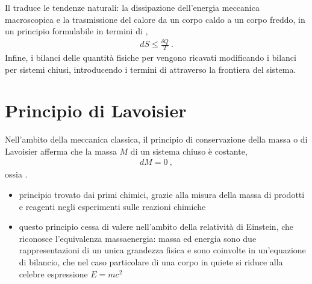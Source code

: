\documentclass[letterpaper,10pt,italian]{jupyterBook}
\begin{document}
\sphinxAtStartPar
Il {\hyperref[\detokenize{ch/thermodynamics/principles-second:physics-hs-thermodynamics-foundation-principles-second}]{}} traduce le tendenze naturali: la dissipazione dell’energia meccanica macroscopica e la trasmissione del calore da un corpo caldo a un corpo freddo, in un principio formulabile in termini di ,
\begin{equation*}
\begin{split}d S \le \frac{\delta Q}{T} \ .\end{split}
\end{equation*}
\sphinxAtStartPar
Infine, i bilanci delle quantità fisiche per {\hyperref[\detokenize{ch/thermodynamics/principles-open:physics-hs-thermodynamics-foundation-principles-open}]{}} vengono ricavati modificando i bilanci per sistemi chiusi, introducendo i termini di  attraverso la frontiera del sistema.



\sphinxstepscope


\section{Principio di Lavoisier}
\label{\detokenize{ch/thermodynamics/principles-lavoisier:principio-di-lavoisier}}\label{\detokenize{ch/thermodynamics/principles-lavoisier:physics-hs-thermodynamics-foundation-principles-lavoisier}}\label{\detokenize{ch/thermodynamics/principles-lavoisier::doc}}
\sphinxAtStartPar
Nell’ambito della meccanica classica, il principio di conservazione della massa \sphinxhyphen{} o di Lavoisier \sphinxhyphen{} afferma che la massa \(M\) di un sistema chiuso è costante,
\begin{equation*}
\begin{split}d M = 0 \ ,\end{split}
\end{equation*}
\sphinxAtStartPar
ossia .
\begin{itemize}
\item {} 
\sphinxAtStartPar
principio trovato dai primi chimici, grazie alla misura della massa di prodotti e reagenti negli esperimenti sulle reazioni chimiche

\item {} 
\sphinxAtStartPar
questo principio cessa di valere nell’ambito della relatività di Einstein, che riconosce l’equivalenza massa\sphinxhyphen{}energia: massa ed energia sono due rappresentazioni di un unica grandezza fisica e sono coinvolte in un’equazione di bilancio, che nel caso particolare di una corpo in quiete si riduce alla celebre espressione \(E = m c^2\)

\end{itemize}
\end{document}
